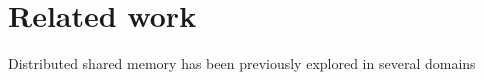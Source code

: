 \section{Related work}
\label{sec:related}


Distributed shared memory has been previously explored in several domains
